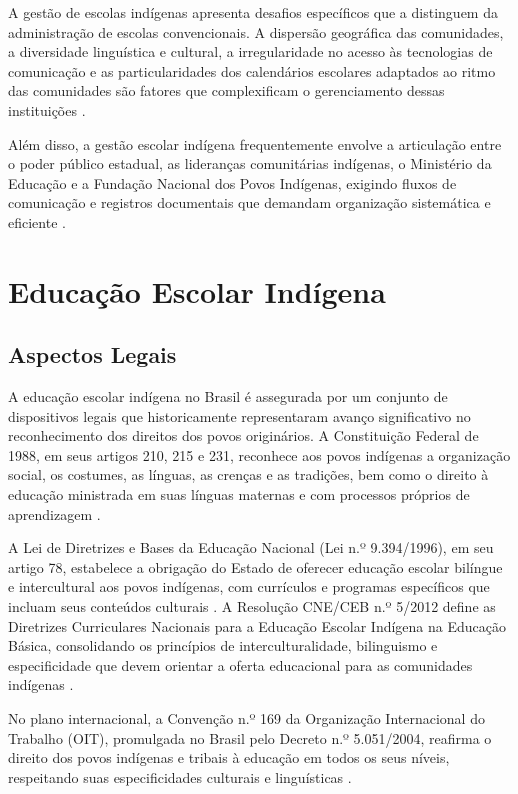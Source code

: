 \documentclass[12pt,a4paper,oneside]{abntspiifac}
\begin{document}
A gestão de escolas indígenas apresenta desafios específicos que a distinguem da administração de escolas convencionais. A dispersão geográfica das comunidades, a diversidade linguística e cultural, a irregularidade no acesso às tecnologias de comunicação e as particularidades dos calendários escolares adaptados ao ritmo das comunidades são fatores que complexificam o gerenciamento dessas instituições \cite{grupioni2006}.

Além disso, a gestão escolar indígena frequentemente envolve a articulação entre o poder público estadual, as lideranças comunitárias indígenas, o Ministério da Educação e a Fundação Nacional dos Povos Indígenas, exigindo fluxos de comunicação e registros documentais que demandam organização sistemática e eficiente \cite{brasil2012}.

\section{Educação Escolar Indígena}

\subsection{Aspectos Legais}

A educação escolar indígena no Brasil é assegurada por um conjunto de dispositivos legais que historicamente representaram avanço significativo no reconhecimento dos direitos dos povos originários. A Constituição Federal de 1988, em seus artigos 210, 215 e 231, reconhece aos povos indígenas a organização social, os costumes, as línguas, as crenças e as tradições, bem como o direito à educação ministrada em suas línguas maternas e com processos próprios de aprendizagem \cite{brasil1988}.

A Lei de Diretrizes e Bases da Educação Nacional (Lei n.º 9.394/1996), em seu artigo 78, estabelece a obrigação do Estado de oferecer educação escolar bilíngue e intercultural aos povos indígenas, com currículos e programas específicos que incluam seus conteúdos culturais \cite{brasil1996}. A Resolução CNE/CEB n.º 5/2012 define as Diretrizes Curriculares Nacionais para a Educação Escolar Indígena na Educação Básica, consolidando os princípios de interculturalidade, bilinguismo e especificidade que devem orientar a oferta educacional para as comunidades indígenas \cite{brasil2012}.

No plano internacional, a Convenção n.º 169 da Organização Internacional do Trabalho (OIT), promulgada no Brasil pelo Decreto n.º 5.051/2004, reafirma o direito dos povos indígenas e tribais à educação em todos os seus níveis, respeitando suas especificidades culturais e linguísticas \cite{brazil2004}.
\end{document}
